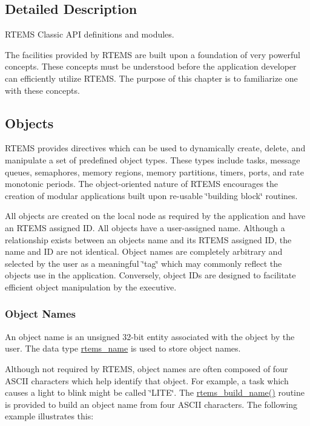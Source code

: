 \subsection{Detailed Description}
R\+T\+E\+MS Classic A\+PI definitions and modules. 

The facilities provided by R\+T\+E\+MS are built upon a foundation of very powerful concepts. These concepts must be understood before the application developer can efficiently utilize R\+T\+E\+MS. The purpose of this chapter is to familiarize one with these concepts.\hypertarget{group__RTEMSAPIClassic_ClassicRTEMSSecObjects}{}\subsection{Objects}\label{group__RTEMSAPIClassic_ClassicRTEMSSecObjects}
R\+T\+E\+MS provides directives which can be used to dynamically create, delete, and manipulate a set of predefined object types. These types include tasks, message queues, semaphores, memory regions, memory partitions, timers, ports, and rate monotonic periods. The object-\/oriented nature of R\+T\+E\+MS encourages the creation of modular applications built upon re-\/usable \char`\"{}building block\char`\"{} routines.

All objects are created on the local node as required by the application and have an R\+T\+E\+MS assigned ID. All objects have a user-\/assigned name. Although a relationship exists between an object\textquotesingle{}s name and its R\+T\+E\+MS assigned ID, the name and ID are not identical. Object names are completely arbitrary and selected by the user as a meaningful \char`\"{}tag\char`\"{} which may commonly reflect the object\textquotesingle{}s use in the application. Conversely, object I\+Ds are designed to facilitate efficient object manipulation by the executive.\hypertarget{group__RTEMSAPIClassic_ClassicRTEMSSubSecObjectNames}{}\subsubsection{Object Names}\label{group__RTEMSAPIClassic_ClassicRTEMSSubSecObjectNames}
An object name is an unsigned 32-\/bit entity associated with the object by the user. The data type \mbox{\hyperlink{group__ClassicTasks_ga55fb63c49f68c0cbd9bee004da15b1fd}{rtems\+\_\+name}} is used to store object names.

Although not required by R\+T\+E\+MS, object names are often composed of four A\+S\+C\+II characters which help identify that object. For example, a task which causes a light to blink might be called \char`\"{}\+L\+I\+T\+E\char`\"{}. The \mbox{\hyperlink{group__ClassicClassInfo_ga3f71442fa9093ffaa102cde5dcbd7daf}{rtems\+\_\+build\+\_\+name()}} routine is provided to build an object name from four A\+S\+C\+II characters. The following example illustrates this\+:


